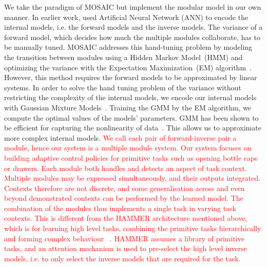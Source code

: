 We take the paradigm of MOSAIC but implement the modular model in our
own manner. In earlier work, \citet{wolpert1998multiple} used
Artificial Neural Network (ANN) to encode the internal models,
i.e. the forward models and the inverse models. The variance of a
forward model, which decides how much the multiple modules
collaborate, has to be manually tuned. MOSAIC addresses this
hand-tuning problem by modeling the transition between modules using a
Hidden Markov Model~(HMM) and optimizing the variance with the
Expectation Maximization~(EM)
algorithm~\citep{haruno2001mosaic}. However, this method requires the
forward models to be approximated by linear systems. In order to solve
the hand tuning problem of the variance without restricting the
complexity of the internal models, we encode our internal models with
Gaussian Mixture Models~\citep[GMM, ][]{cohn1996active}. Training the
GMM by the EM algorithm, we compute the optimal values of the models'
parameters. GMM has been shown to be efficient for capturing the
nonlinearity of
data~\citep{calinon2007incremental,sauser2011iterative,huang2013learning}.
This allows us to approximate more complex internal models.
\textcolor{red}{We call each pair of forward-inverse pair a module,
  hence our system is a multiple module system. Our system focuses on
  building adaptive control policies for primitive tasks such as opening
  bottle caps or drawers. Each module %
  both handles and detects an aspect of task context.  Multiple
  modules may be expressed simultaneously, and their outputs
  integrated.  Contexts therefore are not discrete, and some
  generalisation across and even beyond demonstrated contexts can be
  performed by the learned model.  The combination of the modules thus
  implements a single task in varying task contexts. This is different
  from the HAMMER architecture mentioned above, which is for learning
  high level tasks, combining the primitive tasks hierarchically and
  forming complex behaviour ~\citep{johnson2005hierarchies}. HAMMER
  assumes a library of primitive tasks, and an attention mechanism is
  used to pre-select the high level inverse models, i.e. to only
  select the inverse models that are required for the task.  }

